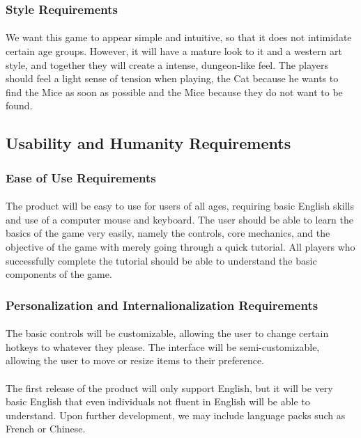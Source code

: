 \documentclass[12pt, titlepage]{article}
\begin{document}
\subsubsection{Style Requirements}
\paragraph{}We want this game to appear simple and intuitive, so that it does not intimidate certain age groups. However, it will have a mature look to it and a western art style, and together they will create a intense, dungeon-like feel. The players should feel a light sense of tension when playing, the Cat because he wants to find the Mice as soon as possible and the Mice because they do not want to be found.  
\subsection{Usability and Humanity Requirements}
\subsubsection{Ease of Use Requirements}
\paragraph{}The product will be easy to use for users of all ages, requiring basic English skills and use of a computer mouse and keyboard. The user should be able to learn the basics of the game very easily, namely the controls, core mechanics, and the objective of the game with merely going through a quick tutorial. All players who successfully complete the tutorial should be able to understand the basic components of the game. 
\subsubsection{Personalization and Internalionalization Requirements}
\paragraph{}The basic controls will be customizable, allowing the user to change certain hotkeys to whatever they please. The interface will be semi-customizable, allowing the user to move or resize items to their preference. 
\paragraph{}The first release of the product will only support English, but it will be very basic English that even individuals not fluent in English will be able to understand. Upon further development, we may include language packs such as French or Chinese. 
\end{document}
